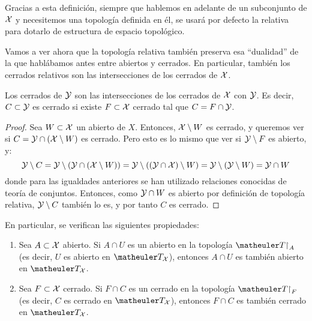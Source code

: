 Gracias a esta definición, siempre que hablemos en adelante de un subconjunto de $\mathcal{X}$ y necesitemos una topología definida en él, se usará por defecto la relativa para dotarlo de estructura de espacio topológico.

Vamos a ver ahora que la topología relativa también preserva esa ``dualidad'' de la que hablábamos antes entre abiertos y cerrados. En particular, también los cerrados relativos son las intersecciones de los cerrados de $\mathcal{X}$.

\begin{prop}
	Los cerrados de $\mathcal{Y}$ son las intersecciones de los cerrados de $\mathcal{X}$ con $\mathcal{Y}$. Es decir, $C\subset\mathcal{Y}$ es cerrado si existe $F\subset\mathcal{X}$ cerrado tal que $C = F\cap\mathcal{Y}$.
	
	\begin{proof}
		Sea $W\subset\mathcal{X}$ un abierto de $X$. Entonces, $\mathcal{X}\setminus W$ es cerrado, y queremos ver si $C=\mathcal{Y}\cap(\mathcal{X}\setminus W)$ es cerrado. Pero esto es lo mismo que ver si $\mathcal{Y}\setminus F$ es abierto, y:
		\[\mathcal{Y}\setminus C=\mathcal{Y}\setminus (\mathcal{Y}\cap(\mathcal{X}\setminus W))=\mathcal{Y}\setminus ((\mathcal{Y}\cap\mathcal{X})\setminus W)=\mathcal{Y}\setminus (\mathcal{Y}\setminus W) = \mathcal{Y}\cap W\]
		donde para las igualdades anteriores se han utilizado relaciones conocidas de teoría de conjuntos. Entonces, como $\mathcal{Y}\cap W$ es abierto por definición de topología relativa, $\mathcal{Y}\setminus C$ también lo es, y por tanto $C$ es cerrado.
	\end{proof}
\end{prop}

\begin{obs}
	En particular, se verifican las siguientes propiedades:
	\begin{enumerate}
		\item Sea $A\subset\mathcal{X}$ abierto. Si $A\cap U$ es un abierto en la topología $\T\restriction_A$ (es decir, $U$ es abierto en $\T_\X$), entonces $A\cap U$ es también abierto en $\T_\X$.
		\item Sea $F\subset\mathcal{X}$ cerrado. Si $F\cap C$ es un cerrado en la topología $\T\restriction_F$ (es decir, $C$ es cerrado en $\T_\X$), entonces $F\cap C$ es también cerrado en $\T_\X$. \qedhere
	\end{enumerate}
\end{obs}